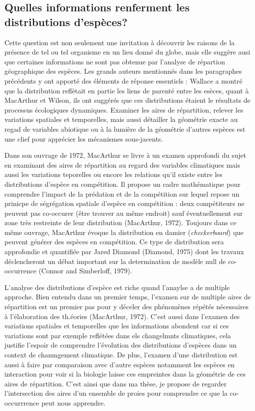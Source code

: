 \subsection*{Quelles informations renferment les distributions
d'espèces?}\label{quelles-informations-renferment-les-distributions-despuxe8ces}

Cette question est non seulement une invitation à découvrir les raisons
de la présence de tel ou tel organisme en un lieu donné du globe, mais
elle suggère ausi que certaines informations ne sont pas obtenue par
l'analyse de répartion géographique des espèces. Les grands auteurs
mentionnés dans les paragraphes précédents y ont apporté des éléments de
réponse essentiels : Wallace a montré que la distribution reflètait en
partie les liens de parenté entre les esèces, quant à MacArthur et
Wilson, ils ont suggérés que ces distributions étaient le résultats de
processus écologiques dynamiques. Examiner les aires de répartition,
relever les variations spatiales et temporelles, mais aussi détailler la
géométrie exacte au regad de variables abiotique ou à la lumière de la
géométrie d'autres espèces est une clief pour apprécier les mécanismes
sous-jacents.

Dans son ouvrage de 1972, MacArthur se livre à un examen approfondi du
sujet en examinant des aires de répartition au regard des variables
climatiques mais aussi les variations teporelles ou encore les relations
qu'il existe entre les distributions d'espèce en compétition. Il propose
un cadre mathématique pour comprendre l'impact de la prédation et de la
compétition sur lequel repose un prinicpe de ségrégation spatiale
d'espèce en compétition : deux compétiteurs ne peuvent pas co-occurer
(être trouver au même endroit) sauf éventuellement sur zone très
restreinte de leur distribution (MacArthur, 1972). Toujours dans ce même
ouvrage, MacArthur évoque la distribution en damier
(\emph{checkerboard}) que peuvent générer des espèces en compétition. Ce
type de distribution sera approfondie et quantifiée par Jared Diamond
(Diamond, 1975) dont les travaux déclencheront un débat important sur la
determination de modèle null de co-occurrence (Connor and Simberloff,
1979).

L'analyse des distributions d'espèce est riche quand l'anaylse a de
multiple approche. Bien entendu dans un premier temps, l'examen sur de
multiple aires de répartition est un premier pas pour y déceler des
phénomènes répétés nécessaires à l'élaboration des th.éories (MacArthur,
1972). C'est aussi dans l'examen des variations spatiales et temporelles
que les informations abondent car si ces variations sont par exemple
reflétées dans els changelmnts climatiques, cela justifie l'espoir de
comprendre l'évolution des distributions d'espèces dans un context de
chanmgement climatique. De plus, l'examen d'une distribution est aussi à
faire par comparaison avec d'autre espèces notamment les espèces en
interaction pour voir si la biologie laisse ces empreintes dans la
géométrie de ces aires de répartition. C'est ainsi que dans ma thèse, je
propose de regarder l'intersection des aires d'un ensemble de proies
pour comprendre ce que la co-occurrrence peut nous apprendre.

